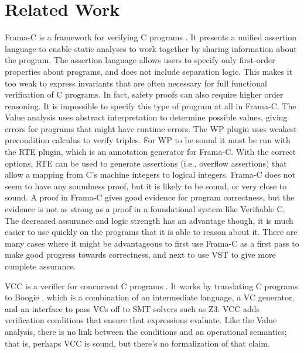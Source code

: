 \documentclass{puthesis}
\begin{document}
\section{Related Work}
Frama-C is a framework for verifying C programs
\cite{cuoq2012frama}. It presents a unified assertion language to
enable static analyses to work together by sharing information about
the program. The assertion language allows
users to specify only first-order properties about programs, and does
not include separation logic. This makes it too weak to express
invariants that are often necessary for full functional verification
of C programs. In fact, safety proofs can also require higher order
reasoning. It is impossible to specify this type of program at all in Frama-C.
The Value analysis \cite{canet2009value}
uses abstract interpretation to determine possible values, giving
errors for programs that might have runtime errors. The WP plugin uses
weakest precondition \cite{mull} calculus to verify triples.  For WP to be sound
it must be run with the RTE plugin\cite{RTEpluginmanual}, which is an annotation generator
for Frama-C. With the correct options, RTE can be used to generate
assertions (i.e., overflow assertions) that allow a mapping from C's
machine integers to logical integers. 
Frama-C does not seem to have any soundness proof, but it is likely to
be sound, or very close to sound. A proof in Frama-C gives good
evidence for program correctness, but the evidence is not as strong as
a proof in a foundational system like Verifiable C. The decreased
assurance and logic strength has an advantage though, it is much
easier to use quickly on the programs that it is able to reason about
it. There are many cases where it might be advantageous to first use
Frama-C as a first pass to make good progress towards correctness, and
next to use VST to give more complete assurance. 

VCC is a verifier for concurrent C programs \cite{VCCtphol}. It works
by translating C programs to Boogie \cite{Boogie}, which is a
combination of an intermediate language, a VC generator, and an
interface to pass VCs off to SMT solvers such as Z3\cite{z3:tacas}.
VCC adds verification conditions that ensure that expressions
evaluate. Like the Value analysis, there is no link between the
conditions and an operational semantics; that is, perhaps VCC is
sound, but there's no formalization of that claim. 
\end{document}
